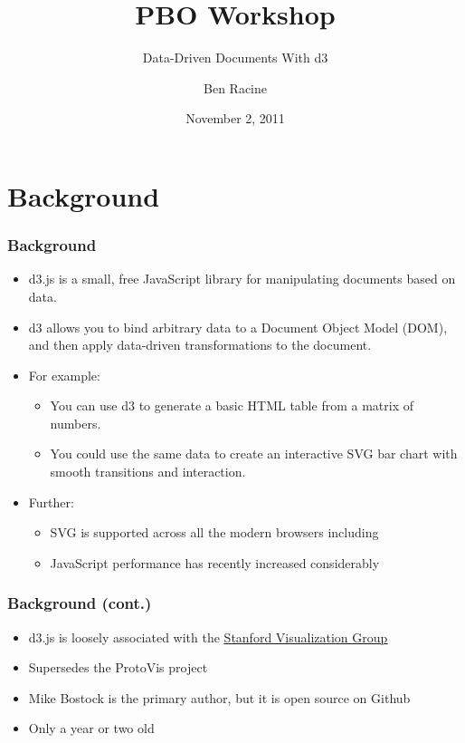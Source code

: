 \documentclass{beamer}
\title{PBO Workshop}
\subtitle{Data-Driven Documents With d3}
\author{Ben Racine \inst{1} }
\institute{\inst{1} Cornerstone Systems NW }
\date{November 2, 2011}
\begin{document}
\begin{frame}
    \frametitle{}
    \titlepage
\end{frame}





\section{Background}

\begin{frame}
\frametitle{Background}
\begin{itemize}
\item d3.js is a small, free JavaScript library for manipulating documents based on data.
\item d3 allows you to bind arbitrary data to a Document Object Model (DOM), and then apply data-driven transformations to the document. 
\item For example:
    \begin{itemize}
    \item You can use d3 to generate a basic HTML table from a matrix of numbers.
    \item You could use the same data to create an interactive SVG bar chart with smooth transitions and interaction.
    \end{itemize}
\item Further:
    \begin{itemize}
    \item SVG is supported across all the modern browsers including
    \item JavaScript performance has recently increased considerably
    \end{itemize}
\end{itemize}
\end{frame}



\begin{frame}
\frametitle{Background (cont.)}
\begin{itemize}
\item d3.js is loosely associated with the \href{http://vis.stanford.edu/}{\underline{Stanford Visualization Group}}
\item Supersedes the ProtoVis project
\item Mike Bostock is the primary author, but it is open source on Github
\item Only a year or two old
\end{itemize}
\end{frame}
\end{document}
